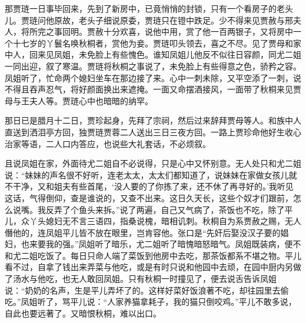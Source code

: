 \begin{parag}


    那贾琏一日事毕回来，先到了新房中，已竟悄悄的封锁，只有一个看房子的老头儿。贾琏问他原故，老头子细说原委，贾琏只在镫中跌足。少不得来见贾赦与邢夫人，将所完之事回明。贾赦十分欢喜，说他中用，赏了他一百两银子，又将房中一个十七岁的丫鬟名唤秋桐者，赏他为妾。贾琏叩头领去，喜之不尽。见了贾母和家中人，回来见凤姐，未免脸上有些愧色。谁知凤姐儿他反不似往日容颜，同尤二姐一同出迎，叙了寒温。贾琏将秋桐之事说了，未免脸上有些得意之色，骄矜之容。凤姐听了，忙命两个媳妇坐车在那边接了来。心中一刺未除，又平空添了一刺，说不得且吞声忍气，将好颜面换出来遮掩。一面又命摆酒接风，一面带了秋桐来见贾母与王夫人等。贾琏心中也暗暗的纳罕。
\end{parag}


\begin{parag}


    那日已是腊月十二日，贾珍起身，先拜了宗祠，然后过来辞拜贾母等人。和族中人直送到洒泪亭方回，独贾琏贾蓉二人送出三日三夜方回。一路上贾珍命他好生收心治家等语，二人口内答应，也说些大礼套话，不必烦叙。
\end{parag}


\begin{parag}


    且说凤姐在家，外面待尤二姐自不必说得，只是心中又怀别意。无人处只和尤二姐说：“妹妹的声名很不好听，连老太太，太太们都知道了，说妹妹在家做女孩儿就不干净，又和姐夫有些首尾，‘没人要的了你拣了来，还不休了再寻好的。’我听见这话，气得倒仰，查是谁说的，又查不出来。这日久天长，这些个奴才们跟前，怎么说嘴。我反弄了个鱼头来拆。”说了两遍，自己又气病了，茶饭也不吃，除了平儿，众丫头媳妇无不言三语四，指桑说槐，暗相讥刺。秋桐自为系贾赦之赐，无人僭他的，连凤姐平儿皆不放在眼里，岂肯容他。张口是“先奸后娶没汉子要的娼妇，也来要我的强。”凤姐听了暗乐，尤二姐听了暗愧暗怒暗气。凤姐既装病，便不和尤二姐吃饭了。每日只命人端了菜饭到他房中去吃，那茶饭都系不堪之物。平儿看不过，自拿了钱出来弄菜与他吃，或是有时只说和他园中去顽，在园中厨内另做了汤水与他吃，也无人敢回凤姐。只有秋桐一时撞见了，便去说舌告诉凤姐说：“奶奶的名声，生是平儿弄坏了的。这样好菜好饭浪著不吃，却往园里去偷吃。”凤姐听了，骂平儿说：“人家养猫拿耗子，我的猫只倒咬鸡。”平儿不敢多说，自此也要远著了。又暗恨秋桐，难以出口。
\end{parag}


